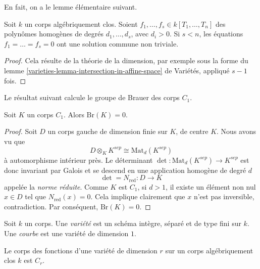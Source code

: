 \noindent
En fait, on a le lemme élémentaire suivant.

\begin{lemma}
\label{lemma-algebraically-closed-find-solutions}
Soit $k$ un corps algébriquement clos. Soient
$f_1, \ldots, f_s \in k[T_1, \ldots, T_n]$
des polynômes homogènes de degrés $d_1, \ldots, d_s$, avec $d_i
> 0$. Si $s < n$, les équations $f_1 = \ldots = f_s = 0$ ont une solution
commune non triviale.
\end{lemma}

\begin{proof}
Cela résulte de la théorie de la dimension, par exemple sous la forme du
lemme \ref{varieties-lemma-intersection-in-affine-space} de Variétés,
appliqué $s - 1$ fois.
\end{proof}

\noindent
Le résultat suivant calcule le groupe de Brauer des corps $C_1$.

\begin{theorem}
\label{theorem-C1-brauer-group-zero}
Soit $K$ un corps $C_1$. Alors $\text{Br}(K) = 0$.
\end{theorem}

\begin{proof}
Soit $D$ un corps gauche de dimension finie sur $K$, de centre $K$. Nous
avons vu que
$$
D \otimes_K K^{sep} \cong \text{Mat}_d(K^{sep})
$$
à automorphisme intérieur près. Le déterminant $\det :
\text{Mat}_d(K^{sep}) \to K^{sep}$ est donc invariant par Galois et se descend en une
application homogène de degré $d$
$$
\det = N_\text{red} : D \longrightarrow K
$$
appelée la {\it norme réduite}. Comme $K$ est $C_1$, si $d > 1$, il existe
un élément non nul $x \in D$ tel que $N_\text{red}(x) = 0$. Cela implique clairement
que $x$ n'est pas inversible, contradiction. Par conséquent, $\text{Br}(K) = 0$.
\end{proof}

\begin{definition}
\label{definition-variety}
Soit $k$ un corps. Une {\it variété} est un schéma intègre, séparé et de
type fini sur $k$. Une {\it courbe} est une variété de dimension $1$.
\end{definition}

\begin{theorem}
\label{theorem-tsen}
Le corps des fonctions d'une variété de dimension $r$ sur un corps algébriquement clos
$k$ est $C_r$.
\end{theorem}

